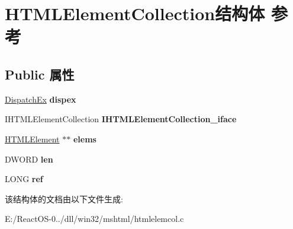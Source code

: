 \hypertarget{struct_h_t_m_l_element_collection}{}\section{H\+T\+M\+L\+Element\+Collection结构体 参考}
\label{struct_h_t_m_l_element_collection}
\subsection*{Public 属性}
\begin{DoxyCompactItemize}
\item 
\mbox{\label{struct_h_t_m_l_element_collection_a360886502f02f6a199fc82e4569f536e}} 
\hyperlink{struct_dispatch_ex}{Dispatch\+Ex} {\bfseries dispex}
\item 
\mbox{\label{struct_h_t_m_l_element_collection_ab9ce79a8050906417a20d718e11a1dbe}} 
I\+H\+T\+M\+L\+Element\+Collection {\bfseries I\+H\+T\+M\+L\+Element\+Collection\+\_\+iface}
\item 
\mbox{\label{struct_h_t_m_l_element_collection_af0fd0003b6a2fed90ca30e77ca8736fb}} 
\hyperlink{struct_h_t_m_l_element}{H\+T\+M\+L\+Element} $\ast$$\ast$ {\bfseries elems}
\item 
\mbox{\label{struct_h_t_m_l_element_collection_ab72b64331dad50f49ac42b9ce60ccbb2}} 
D\+W\+O\+RD {\bfseries len}
\item 
\mbox{\label{struct_h_t_m_l_element_collection_a66cc2ffaf5230d577ee2f9ed495f7164}} 
L\+O\+NG {\bfseries ref}
\end{DoxyCompactItemize}


该结构体的文档由以下文件生成\+:\begin{DoxyCompactItemize}
\item 
E\+:/\+React\+O\+S-\/0../dll/win32/mshtml/htmlelemcol.\+c\end{DoxyCompactItemize}
